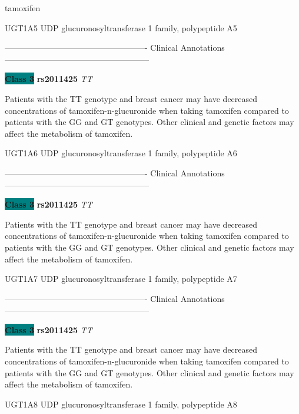 \documentclass{resume} %
\begin{document}
\begin{rSection}{ tamoxifen }
\begin{rSubsection}{ UGT1A5 }{ UDP glucuronosyltransferase 1 family, polypeptide A5 }{}{}
\item[] ---------------------------------------------------- Clinical Annotations -----------------------------------------------------\newline
\item \textbf{\colorbox{teal} {Class 3}} \textbf{ rs2011425 } \textit{ TT }
\item[] Patients with the TT genotype and breast cancer may have decreased concentrations of tamoxifen-n-glucuronide when taking tamoxifen compared to patients with the GG and GT genotypes. Other clinical and genetic factors may affect the metabolism of tamoxifen.
\end{rSubsection}\begin{rSubsection}{ UGT1A6 }{ UDP glucuronosyltransferase 1 family, polypeptide A6 }{}{}
\item[]

\item[] ---------------------------------------------------- Clinical Annotations -----------------------------------------------------\newline
\item \textbf{\colorbox{teal} {Class 3}} \textbf{ rs2011425 } \textit{ TT }
\item[] Patients with the TT genotype and breast cancer may have decreased concentrations of tamoxifen-n-glucuronide when taking tamoxifen compared to patients with the GG and GT genotypes. Other clinical and genetic factors may affect the metabolism of tamoxifen.
\end{rSubsection}\begin{rSubsection}{ UGT1A7 }{ UDP glucuronosyltransferase 1 family, polypeptide A7 }{}{}
\item[]

\item[] ---------------------------------------------------- Clinical Annotations -----------------------------------------------------\newline
\item \textbf{\colorbox{teal} {Class 3}} \textbf{ rs2011425 } \textit{ TT }
\item[] Patients with the TT genotype and breast cancer may have decreased concentrations of tamoxifen-n-glucuronide when taking tamoxifen compared to patients with the GG and GT genotypes. Other clinical and genetic factors may affect the metabolism of tamoxifen.
\end{rSubsection}\begin{rSubsection}{ UGT1A8 }{ UDP glucuronosyltransferase 1 family, polypeptide A8 }{}{}
\item[]


\end{rSubsection}
\end{rSection}
\end{document}

